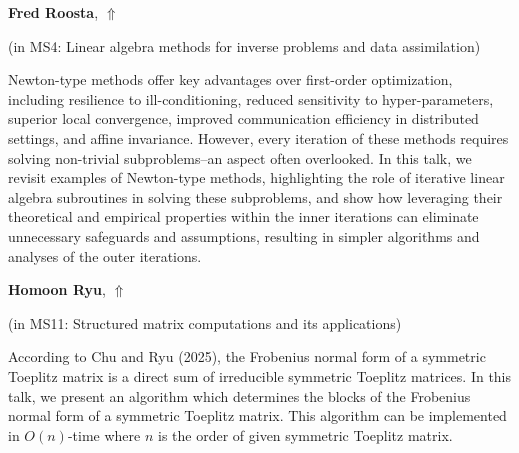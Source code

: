 \documentclass[ILAS2025-program.tex]{subfiles}
\begin{document}
\hypertarget{down0313}{}\begin{ilasabstract}
    
\textbf{Fred Roosta},  \hfill \hyperlink{up0313}{$\Uparrow$}
    
    
(in {\color{mstitle}MS4: Linear algebra methods for inverse problems and data assimilation})
        
\mtskip
    Newton-type methods offer key advantages over first-order optimization, including resilience to ill-conditioning, reduced sensitivity to hyper-parameters, superior local convergence, improved communication efficiency in distributed settings, and affine invariance. However, every iteration of these methods requires solving non-trivial subproblems--an aspect often overlooked. In this talk, we revisit examples of Newton-type methods, highlighting the role of iterative linear algebra subroutines in solving these subproblems, and show how leveraging their theoretical and empirical properties within the inner iterations can eliminate unnecessary safeguards and assumptions, resulting in simpler algorithms and analyses of the outer iterations.

\end{ilasabstract}
    

\hypertarget{down0269}{}\begin{ilasabstract}
    
\textbf{Homoon Ryu},  \hfill \hyperlink{up0269}{$\Uparrow$}
    
    
(in {\color{mstitle}MS11: Structured matrix computations and its applications})
        
\mtskip
    According to Chu and Ryu (2025), the Frobenius normal form of a symmetric Toeplitz matrix is a direct sum of irreducible symmetric Toeplitz matrices. 
In this talk, we present an algorithm which determines the blocks of the Frobenius normal form of a symmetric Toeplitz matrix. 
This algorithm can be implemented in $O(n)$-time where $n$ is the order of given symmetric Toeplitz matrix. 

\end{ilasabstract}
    
\end{document}
